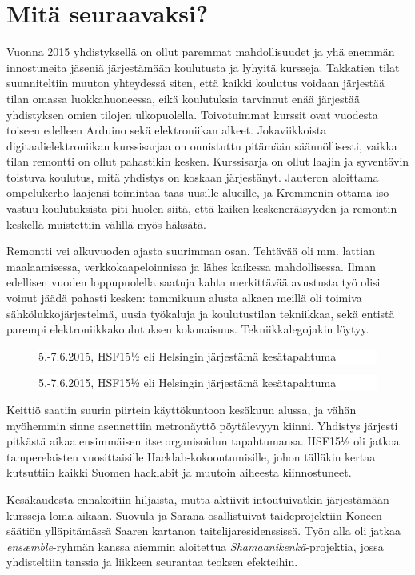 \documentclass[a4paper]{memoir}
\newcommand{\varitys}{white}
\newlength{\aXa}
\newlength{\aXb}
\newcommand{\jana}[1]{
        \setlength{\aXa}{4cm}
        \setlength{\aXb}{0.4\textwidth}
   \ifodd\value{page}
        \begin{figure}\vspace{-7pt} \hspace{5pt} \colorbox{\varitys}{\parbox{\aXb}{   \textsf{{#1}}  }} \vspace{-7pt}\end{figure}
     \else
        \begin{figure}\vspace{-7pt}    \hspace{-5pt}  \colorbox{\varitys}{\parbox{\aXb}{   \textsf{{#1}} }} \vspace{-7pt}\end{figure}
     \fi
}
\begin{document}
\section*{Mitä seuraavaksi?}

Vuonna 2015 yhdistyksellä on ollut paremmat mahdollisuudet ja yhä enemmän innostuneita jäseniä järjestämään koulutusta ja lyhyitä kursseja. Takkatien tilat suunniteltiin muuton yhteydessä siten, että kaikki koulutus voidaan järjestää tilan omassa luokkahuoneessa, eikä koulutuksia tarvinnut enää järjestää yhdistyksen omien tilojen ulkopuolella. Toivotuimmat kurssit ovat vuodesta toiseen edelleen Arduino sekä elektroniikan alkeet. Jokaviikkoista digitaalielektroniikan kurssisarjaa on onnistuttu pitämään säännöllisesti, vaikka tilan remontti on ollut pahastikin kesken. Kurssisarja on ollut laajin ja syventävin toistuva koulutus, mitä yhdistys on koskaan järjestänyt. Jauteron aloittama ompelukerho laajensi toimintaa taas uusille alueille, ja Kremmenin ottama iso vastuu koulutuksista piti huolen siitä, että kaiken keskeneräisyyden ja remontin keskellä muistettiin välillä myös häksätä.

Remontti vei alkuvuoden ajasta suurimman osan. Tehtävää oli mm. lattian maalaamisessa, verkkokaapeloinnissa ja lähes kaikessa mahdollisessa. Ilman edellisen vuoden loppupuolella saatuja kahta merkittävää avustusta työ olisi voinut jäädä pahasti kesken: tammikuun alusta alkaen meillä oli toimiva sähkölukkojärjestelmä, uusia työkaluja ja koulutustilan tekniikkaa, sekä entistä parempi elektroniikkakoulutuksen kokonaisuus. Tekniikkalegojakin löytyy.

\jana{5.-7.6.2015, HSF15½ eli Helsingin järjestämä kesätapahtuma}

Keittiö saatiin suurin piirtein käyttökuntoon kesäkuun alussa, ja vähän myöhemmin sinne asennettiin metronäyttö pöytälevyyn kiinni. Yhdistys järjesti pitkästä aikaa ensimmäisen itse organisoidun tapahtumansa. HSF15½ oli jatkoa tamperelaisten vuosittaisille Hacklab-kokoontumisille, johon tälläkin kertaa kutsuttiin kaikki Suomen hacklabit ja muutoin aiheesta kiinnostuneet.

Kesäkaudesta ennakoitiin hiljaista, mutta aktiivit intoutuivatkin järjestämään kursseja loma-aikaan. Suovula ja Sarana osallistuivat taideprojektiin Koneen säätiön ylläpitämässä Saaren kartanon taitelijaresidenssissä. Työn alla oli jatkaa \textit{ensæmble}-ryhmän kanssa aiemmin aloitettua \textit{Shamaanikenkä}-projektia, jossa yhdisteltiin tanssia ja liikkeen seurantaa teoksen efekteihin.
\end{document}

